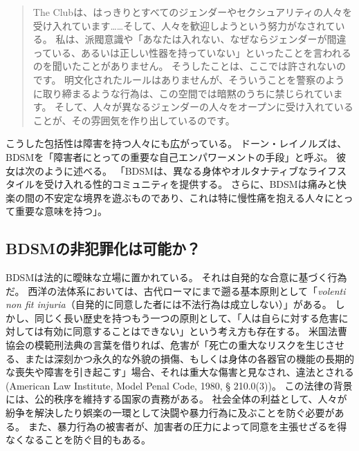 \documentclass[paper=a4,book,openany]{jlreq}
\begin{document}
\begin{quote}
 The Clubは、はっきりとすべてのジェンダーやセクシュアリティの人々を受け入れています……そして、人々を歓迎しようという努力がなされている。
私は、派閥意識や「あなたは入れない、なぜならジェンダーが間違っている、あるいは正しい性器を持っていない」といったことを言われるのを聞いたことがありません。
そうしたことは、ここでは許されないのです。
明文化されたルールはありませんが、そういうことを警察のように取り締まるような行為は、この空間では暗黙のうちに禁じられています。
そして、人々が異なるジェンダーの人々をオープンに受け入れていることが、その雰囲気を作り出しているのです。
\citep[p. 1653]{stone13:_flexib_queer_serious_bodies}
\end{quote}

こうした包括性は障害を持つ人々にも広がっている。
ドーン・レイノルズは、BDSMを「障害者にとっての重要な自己エンパワーメントの手段」と呼ぶ。
彼女は次のように述べる。
「BDSMは、異なる身体やオルタナティブなライフスタイルを受け入れる性的コミュニティを提供する。
さらに、BDSMは痛みと快楽の間の不安定な境界を遊ぶものであり、これは特に慢性痛を抱える人々にとって重要な意味を持つ」\citep{reynolds07:_disab_bdsm}。

\subsection{BDSMの非犯罪化は可能か？}

BDSMは法的に曖昧な立場に置かれている。
それは自発的な合意に基づく行為だ。
西洋の法体系においては、古代ローマにまで遡る基本原則として「\emph{volenti non fit injuria}（自発的に同意した者には不法行為は成立しない）」がある。
しかし、同じく長い歴史を持つもう一つの原則として、「人は自らに対する危害に対しては有効に同意することはできない」という考え方も存在する。
米国法曹協会の模範刑法典の言葉を借りれば、危害が「死亡の重大なリスクを生じさせる、または深刻かつ永久的な外貌の損傷、もしくは身体の各器官の機能の長期的な喪失や障害を引き起こす」場合、それは重大な傷害と見なされ、違法とされる(American Law Institute, Model Penal Code, 1980, § 210.0(3))。
この法律の背景には、公的秩序を維持する国家の責務がある。
社会全体の利益として、人々が紛争を解決したり娯楽の一環として決闘や暴力行為に及ぶことを防ぐ必要がある。
また、暴力行為の被害者が、加害者の圧力によって同意を主張せざるを得なくなることを防ぐ目的もある。
\end{document}
